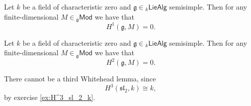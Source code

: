 \begin{theorem}
	\label{thm:Wfl}
	Let $k$ be a field of characteristic zero and $\mathfrak{g} \in {_{k}}\mathsf{LieAlg}$ semisimple. Then for any finite-dimensional $M \in {_{\mathfrak{g}}}\mathsf{Mod}$ we have that
	\begin{equation*}
		H^1(\mathfrak{g},M) = 0.
	\end{equation*}
\end{theorem}

\begin{theorem}
	\label{thm:Wfl}
	Let $k$ be a field of characteristic zero and $\mathfrak{g} \in {_{k}}\mathsf{LieAlg}$ semisimple. Then for any finite-dimensional $M \in {_{\mathfrak{g}}}\mathsf{Mod}$ we have that
	\begin{equation*}
		H^2(\mathfrak{g},M) = 0.
	\end{equation*}
\end{theorem}

\begin{remark}
	There cannot be a third Whitehead lemma, since
	\begin{equation*}
		H^3(\mathfrak{sl}_2,k) \cong k,
	\end{equation*}
	\noindent by exercise \ref{ex:H^3_sl_2_k}.
\end{remark}

\printbibliography


